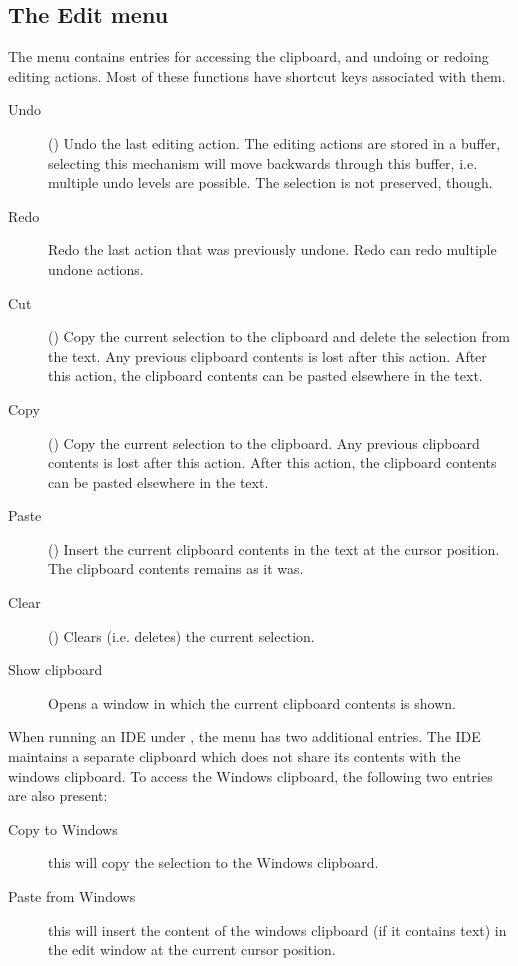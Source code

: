 \subsection{The Edit menu}
\label{se:menuedit}
The  menu contains entries for accessing the clipboard, and
undoing or redoing editing actions. Most of these functions have shortcut
keys associated with them.
\begin{description}
\item[Undo] ()
Undo the last editing action. The editing actions are stored in a buffer,
selecting this mechanism will move backwards through this buffer, i.e.
multiple undo levels are possible. The selection is not preserved, though.
\item[Redo] Redo the last action that was previously undone. Redo can redo
multiple undone actions.
\item[Cut] () Copy the current selection to the clipboard
and delete the selection from the text. Any previous clipboard contents is
lost after this action. After this action, the clipboard contents can be
pasted elsewhere in the text.
\item[Copy] () Copy the current selection to the clipboard.
Any previous clipboard contents is lost after this action.
After this action, the clipboard contents can be pasted elsewhere in the text.
\item[Paste] () Insert the current clipboard contents in
the text at the cursor position. The clipboard contents remains as it was.
\item[Clear] () Clears (i.e. deletes) the current
selection.
\item[Show clipboard] Opens a window in which the current clipboard contents
is shown.
\end{description}
When running an IDE under \windows, the  menu has two
additional entries. The IDE maintains a separate clipboard which does
not share its contents with the windows clipboard. To access the Windows
clipboard, the following two entries are also present:
\begin{description}
\item[Copy to Windows] this will copy the selection to the Windows
clipboard.
\item[Paste from Windows] this will insert the content of the windows
clipboard (if it contains text) in the edit window at the current cursor
position.
\end{description}

